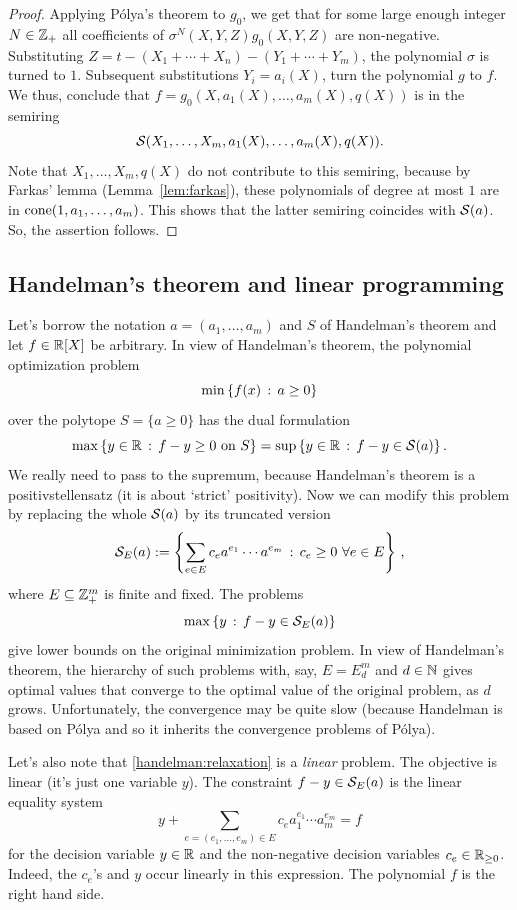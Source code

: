 \begin{proof}
	Applying P\'olya's theorem to $g_0$, we get that for some large enough integer $N \in \mathbb{Z}_+$ all coefficients of $\sigma^N(X,Y,Z) g_0(X,Y,Z) $ are non-negative. Substituting $Z = t - (X_1 + \cdots + X_n) - (Y_1 + \cdots + Y_m)$, the polynomial $\sigma$ is turned to $1$. Subsequent substitutions $Y_i = a_i(X)$, turn the polynomial $g$ to $f$. We thus, conclude that
	$f = g_0(X,a_1(X),\ldots,a_m(X), q(X))$ is in the semiring  \[
		\mathcal{S}(X_1,\ldots,X_m,a_1(X),\ldots,a_m(X),q(X)).
	\] Note that $X_1,\ldots,X_m, q(X)$ do not contribute to this semiring, because by Farkas' lemma (Lemma~\ref{lem:farkas}), these polynomials of degree at most $1$ are in $\operatorname{cone}(1,a_1,\ldots,a_m)$. This shows that the latter semiring coincides with $\mathcal{S}(a)$. So, the assertion follows.
\end{proof}


\subsection{Handelman's theorem and linear programming}

Let's borrow the notation $a=(a_1,\ldots,a_m)$ and $S$ of Handelman's theorem and let $f \in \mathbb{R}[X]$ be arbitrary. In view of Handelman's theorem, the polynomial optimization problem
\[
	\min \left\{ f(x) \,:\, a \ge 0 \right\}
\]
over the polytope $S= \{a \ge 0\}$ has the dual formulation 
\[
	\max \left\{ y \in \mathbb{R} \,:\, f - y \ge 0  \ \text{on} \ S \right\} = \sup \left\{ y \in \mathbb{R} \,:\, f - y \in \mathcal{S}(a) \right\}.
\]
We really need to pass to the supremum, because Handelman's theorem is a positivstellensatz (it is about `strict' positivity). Now we can modify this problem by replacing the whole $\mathcal{S}(a)$ by its truncated version
\[
	\mathcal{S}_E (a) := \left\{  \sum_{e \in E} c_e a^{e_1} \cdots a^{e_m} \,:\, c_e \ge 0 \ \forall e \in E \right\} \,,
\]
where $E \subseteq \mathbb{Z}_+^m$ is finite and fixed. The problems
\begin{equation}
	\label{handelman:relaxation}
	\max \left\{ y \,:\, f - y \in \mathcal{S}_E(a) \right\}
\end{equation}
give lower bounds on the original minimization problem. In view of Handelman's theorem, the hierarchy of such problems with, say, $E=E^m_d$ and $d \in \mathbb{N}$ gives optimal values that converge to the optimal value of the original problem, as $d$ grows. Unfortunately, the convergence may be quite slow (because Handelman is based on P\'olya and so it inherits the convergence problems of P\'olya).

Let's also note that \eqref{handelman:relaxation} is a \emph{linear} problem. The objective is linear (it's just one variable $y$). The constraint $f -y \in \mathcal{S}_E(a)$ is the linear equality system 
\[
	 y+ \sum_{e=(e_1,\ldots,e_m) \in E} c_e a_1^{e_1} \cdots a_m^{e_m} = f
\]
for the decision variable $y \in \mathbb{R}$ and the non-negative decision variables $c_e \in \mathbb{R}_{\ge 0}$. Indeed, the $c_e$'s and $y$ occur linearly in this expression. The polynomial $f$ is the right hand side. 

